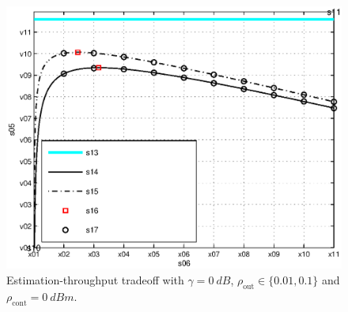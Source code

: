 \documentclass[letterpaper, twocolumn]{IEEEtran}
\newcommand{\sub}[1]{_{\text{#1}}}
\newcommand{\opc}{\rho\sub{out}}
\newcommand{\pc}{\rho\sub{cont}}
\newcommand{\ptran}{P\sub{tran}}
\newcommand{\ite}{\theta\sub{I}}
\newcommand{\gp}{h\sub{p}}
\newcommand{\gs}{h\sub{s}}
\newcommand{\nps}{\sigma^2}
\newcommand{\fsam}{f\sub{s}}
\newcommand{\Ks}{N\sub{s}}
\newcommand{\figscale}{0.80 \columnwidth}
\newcommand{\figscale}{0.38 \columnwidth}
\begin{document}




\begin{figure}[!t]

\centering
\includegraphics[width= \figscale]{figures/fig_thr_est_time_tradeoff_AWGN}
\caption{Estimation-throughput tradeoff with $\gamma = \SI{0}{dB}$, $\opc \in \{0.01, 0.1\}$ and $\pc = \SI{0}{dBm}$.}
\label{fig:ETT}
\vspace{-7mm}
\end{figure}
\end{document}
